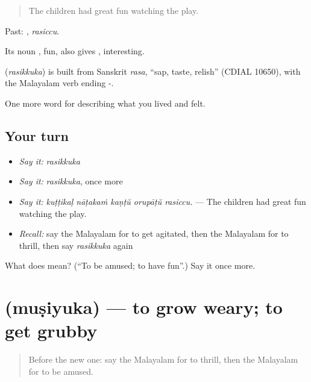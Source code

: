 \begin{quote}
The children had great fun watching the play.
\end{quote}

Past: , \emph{rasiccu}.

Its noun , fun, also gives , interesting.

\begin{cousinweb}
\textbf{} (\emph{rasikkuka}) is built from Sanskrit \emph{rasa}, \textquotedblleft{}sap, taste, relish\textquotedblright{} (CDIAL 10650), with the Malayalam verb ending -.
\end{cousinweb}

\begin{grammarlens}[title={What you've built}]
One more word for describing what you lived and felt.
\end{grammarlens}

\subsection*{Your turn}
\begin{itemize}
\raggedright
  \item \emph{Say it:} \emph{rasikkuka}
  \item \emph{Say it:} \emph{rasikkuka}, once more
  \item \emph{Say it:} \emph{kuṭṭikaḷ nāṭakaṁ kaṇṭŭ orupāṭŭ rasiccu.} — The children had great fun watching the play.
  \item \emph{Recall:} say the Malayalam for to get agitated, then the Malayalam for to thrill, then say \emph{rasikkuka} again
\end{itemize}

\begin{tcolorbox}[breakable,colback=teal!4,colframe=teal!35!black,title={Before you move on}]
What does  mean? (\textquotedblleft{}To be amused; to have fun\textquotedblright{}.) Say it once more.
\end{tcolorbox}
\section[\texorpdfstring{\ml{മുഷിയുക} (muṣiyuka)}{മുഷിയുക (muṣiyuka)}]{ (muṣiyuka) — to grow weary; to get grubby}

\label{lesson:ML-C526-musiyuka}



\begin{quote}
Before the new one: say the Malayalam for to thrill, then the Malayalam for to be amused.
\end{quote}

